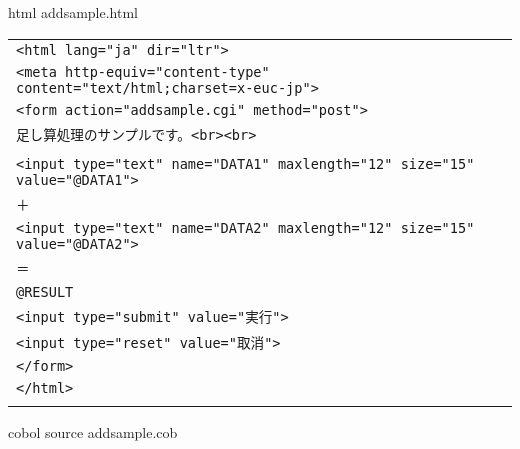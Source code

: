 {\gt html} addsample.html

{\footnotesize 
\begin{tabular}{|l|}
\hline
\vspace{-0.4em}\verb!<html lang="ja" dir="ltr">!\\
\vspace{-0.4em}\verb!<meta http-equiv="content-type" content="text/html;charset=x-euc-jp">!\\
\vspace{-0.4em}\verb!<form action="addsample.cgi" method="post">!\\
\vspace{-0.4em}\verb!足し算処理のサンプルです。<br><br>!\\
\vspace{-0.4em}\verb!!\\
\vspace{-0.4em}\verb!<input type="text" name="DATA1" maxlength="12" size="15" value="@DATA1">!\\
\vspace{-0.4em}\verb!＋!\\
\vspace{-0.4em}\verb!<input type="text" name="DATA2" maxlength="12" size="15" value="@DATA2">!\\
\vspace{-0.4em}\verb!＝!\\
\vspace{-0.4em}\verb!@RESULT!\\
\vspace{-0.4em}\verb!<input type="submit" value="実行">!\\
\vspace{-0.4em}\verb!<input type="reset" value="取消">!\\
\vspace{-0.4em}\verb!</form>!\\
\vspace{-0.4em}\verb!</html>!\\
\\
\hline
\end{tabular}
}

\vspace{1em}
{\gt cobol source} addsample.cob

